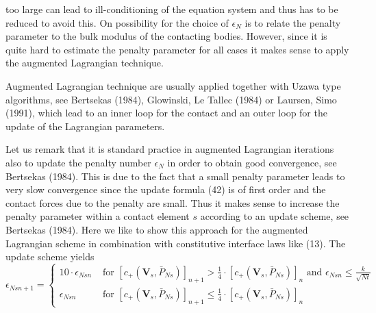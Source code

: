 too large can lead to ill-conditioning of the equation system and thus has to be reduced to avoid this. On possibility for the choice of $ \epsilon_{N} $ is to relate the penalty parameter to the bulk modulus of the contacting bodies. However, since it is quite hard to estimate the penalty parameter for all cases it makes sense to apply the augmented Lagrangian technique.

Augmented Lagrangian technique are usually applied together with Uzawa type algorithms, see Bertsekas (1984), Glowinski, Le Tallec (1984) or Laursen, Simo (1991), which lead to an inner loop for the contact and an outer loop for the update of the Lagrangian parameters.



Let us remark that it is standard practice in augmented Lagrangian iterations also to update the penalty number $ \epsilon_{N} $ in order to obtain good convergence, see Bertsekas (1984). This is due to the fact that a small penalty parameter leads to very slow convergence since the update formula (42) is of first order and the contact forces due to the penalty are small. Thus it makes sense to increase the penalty parameter within a contact element $ s $ according to an update scheme, see Bertsekas (1984). Here we like to show this approach for the augmented Lagrangian scheme in combination with constitutive interface laws like (13). The update scheme yields
\begin{equation}
\label{eqn:4.74}
 \epsilon_{N s n+1}=\left\{\begin{array}{ll}10 \cdot \epsilon_{N s n} & \text { for }\left[c_{+}\left(\mathbf{V}_{s}, \bar{P}_{N s}\right)\right]_{n+1}>\frac{1}{4} \cdot\left[c_{+}\left(\mathbf{V}_{s}, \bar{P}_{N s}\right)\right]_{n} \text { and } \epsilon_{N s n} \leq \frac{k}{\sqrt{N t}} \\ \epsilon_{N s n} & \text { for }\left[c_{+}\left(\mathbf{V}_{s}, \bar{P}_{N s}\right)\right]_{n+1} \leq \frac{1}{4} \cdot\left[c_{+}\left(\mathbf{V}_{s}, \bar{P}_{N s}\right)\right]_{n}\end{array}\right. 
\end{equation}

